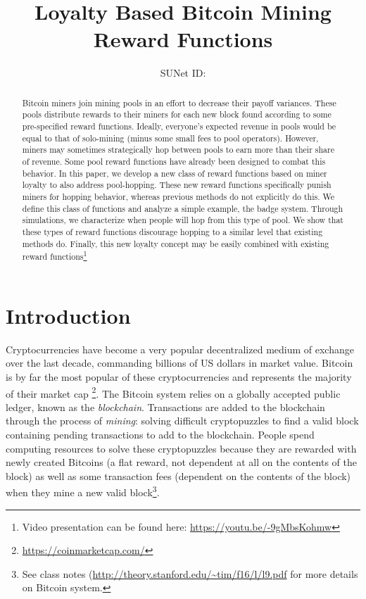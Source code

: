 \documentclass{article}
\title{Loyalty Based Bitcoin Mining Reward Functions}
\author{\studentname \qquad SUNet ID: \suid}
\theoremstyle{plain}
\theoremstyle{definition}
\begin{document}
\maketitle

\begin{abstract}
Bitcoin miners join mining pools in an effort to decrease their payoff variances. These pools distribute rewards to their miners for each new block found according to some pre-specified reward functions. Ideally, everyone's expected revenue in pools would be equal to that of solo-mining (minus some small fees to pool operators). However, miners may sometimes strategically hop between pools to earn more than their share of revenue. Some pool reward functions have already been designed to combat this behavior\cite{Rosefeld2011}. In this paper, we develop a new class of reward functions based on miner loyalty to also address pool-hopping. These new reward functions specifically punish miners for hopping behavior, whereas previous methods do not explicitly do this. We define this class of functions and analyze a simple example, the badge system. Through simulations, we characterize when people will hop from this type of pool. We show that these types of reward functions discourage hopping to a similar level that existing methods do. Finally, this new loyalty concept may be easily combined with existing reward functions\footnote{Video presentation can be found here: \url{https://youtu.be/-9gMbsKohmw}}
\end{abstract}

\section{Introduction}
Cryptocurrencies have become a very popular decentralized medium of exchange over the last decade, commanding billions of US dollars in market value. Bitcoin is by far the most popular of these cryptocurrencies and represents the majority of their market cap \footnote{\url{https://coinmarketcap.com/}}. The Bitcoin system relies on a globally accepted public ledger, known as the \emph{blockchain}. Transactions are added to the blockchain through the process of \emph{mining}: solving difficult cryptopuzzles to find a valid block containing pending transactions to add to the blockchain. People spend computing resources to solve these cryptopuzzles because they are rewarded with newly created Bitcoins (a flat reward, not dependent at all on the contents of the block) as well as some transaction fees (dependent on the contents of the block) when they mine a new valid block\footnote{See class notes (\url{http://theory.stanford.edu/~tim/f16/l/l9.pdf} for more details on Bitcoin system.}.
\end{document}
